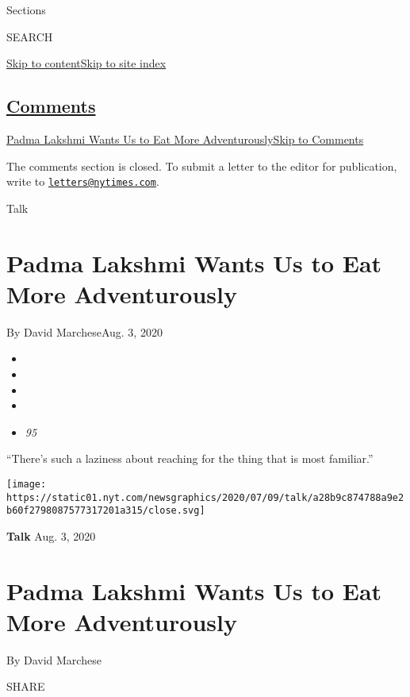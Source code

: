 Sections

SEARCH

\protect\hyperlink{site-content}{Skip to
content}\protect\hyperlink{site-index}{Skip to site index}

\hypertarget{comments}{%
\subsection{\texorpdfstring{\protect\hyperlink{commentsContainer}{Comments}}{Comments}}\label{comments}}

\href{}{Padma Lakshmi Wants Us to Eat More Adventurously}\href{}{Skip to
Comments}

The comments section is closed. To submit a letter to the editor for
publication, write to
\href{mailto:letters@nytimes.com}{\nolinkurl{letters@nytimes.com}}.

Talk

\hypertarget{padma-lakshmi-wants-us-to-eat-more-adventurously}{%
\section{Padma Lakshmi Wants Us to Eat More
Adventurously}\label{padma-lakshmi-wants-us-to-eat-more-adventurously}}

By David MarcheseAug. 3, 2020

\begin{itemize}
\item
\item
\item
\item
\item
  \emph{95}
\end{itemize}

``There's such a laziness about reaching for the thing that is most
familiar.''

\texttt{[image: https://static01.nyt.com/newsgraphics/2020/07/09/talk/a28b9c874788a9e2b60f2798087577317201a315/close.svg]}

\textbf{Talk} Aug. 3, 2020

\hypertarget{padma-lakshmi-wants-us-to-eat-more-adventurously-1}{%
\section{Padma Lakshmi Wants Us to Eat More
Adventurously}\label{padma-lakshmi-wants-us-to-eat-more-adventurously-1}}

By David Marchese

SHARE

